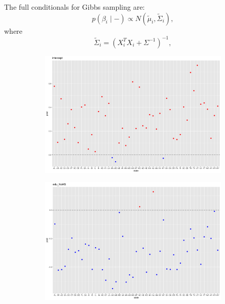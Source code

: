 \documentclass[11pt]{article}
\begin{document}
The full conditionals for Gibbs sampling are:
$$p(\beta_i \mid - ) \propto N(\tilde{\mu}_i, \tilde{\Sigma}_i),$$
where
$$\tilde{\Sigma}_i = (X_i^TX_i + \Sigma^{-1})^{-1},$$

\begin{figure}
    \centering
    \begin{subfigure}[t]{0.9\textwidth}
        \centering
        \includegraphics[width=\linewidth]{Ex5/figures/2post covariates1.png} 
    \end{subfigure}
    \hfill
    \begin{subfigure}[t]{0.9\textwidth}
        \centering
        \includegraphics[width=\linewidth]{Ex5/figures/2post covariates2.png} 
    \end{subfigure}
\end{figure}
\end{document}
